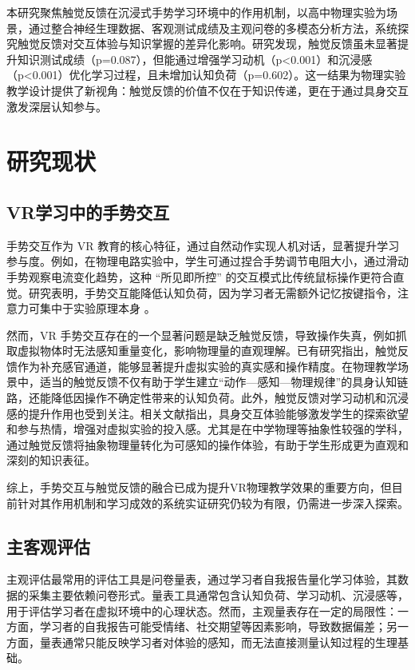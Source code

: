 \documentclass[runningheads]{llncs}
\begin{document}
本研究聚焦触觉反馈在沉浸式手势学习环境中的作用机制，以高中物理实验为场景，通过整合神经生理数据、客观测试成绩及主观问卷的多模态分析方法，系统探究触觉反馈对交互体验与知识掌握的差异化影响。研究发现，触觉反馈虽未显著提升知识测试成绩（p=0.087），但能通过增强学习动机（p<0.001）和沉浸感（p<0.001）优化学习过程，且未增加认知负荷（p=0.602）。这一结果为物理实验教学设计提供了新视角：触觉反馈的价值不仅在于知识传递，更在于通过具身交互激发深层认知参与。


\section{研究现状}
\subsection{VR学习中的手势交互} 

手势交互作为 VR 教育的核心特征，通过自然动作实现人机对话，显著提升学习参与度\cite{johnson2017embodied}。例如，在物理电路实验中，学生可通过捏合手势调节电阻大小，通过滑动手势观察电流变化趋势，这种 “所见即所控” 的交互模式比传统鼠标操作更符合直觉\cite{philippe2020multimodal}。研究表明，手势交互能降低认知负荷，因为学习者无需额外记忆按键指令，注意力可集中于实验原理本身 \cite {hostetter2023comparing}。

然而，VR 手势交互存在的一个显著问题是缺乏触觉反馈，导致操作失真，例如抓取虚拟物体时无法感知重量变化，影响物理量的直观理解\cite{park2025ultraboard}。已有研究指出，触觉反馈作为补充感官通道，能够显著提升虚拟实验的真实感和操作精度。在物理教学场景中，适当的触觉反馈不仅有助于学生建立“动作—感知—物理规律”的具身认知链路，还能降低因操作不确定性带来的认知负荷\cite{zhai2021study}。此外，触觉反馈对学习动机和沉浸感的提升作用也受到关注。相关文献指出，具身交互体验能够激发学生的探索欲望和参与热情，增强对虚拟实验的投入感\cite{kontra2015physical,lindgren2016enhancing}。尤其是在中学物理等抽象性较强的学科，通过触觉反馈将抽象物理量转化为可感知的操作体验，有助于学生形成更为直观和深刻的知识表征\cite{han2011incorporating}。

综上，手势交互与触觉反馈的融合已成为提升VR物理教学效果的重要方向，但目前针对其作用机制和学习成效的系统实证研究仍较为有限，仍需进一步深入探索。

\subsection{主客观评估}
主观评估最常用的评估工具是问卷量表，通过学习者自我报告量化学习体验，其数据的采集主要依赖问卷形式。量表工具通常包含认知负荷\cite{sweller1988cognitive}、学习动机\cite{keller1987development}、沉浸感\cite{sherman2003understanding}等，用于评估学习者在虚拟环境中的心理状态。然而，主观量表存在一定的局限性：一方面，学习者的自我报告可能受情绪、社交期望等因素影响，导致数据偏差；另一方面，量表通常只能反映学习者对体验的感知，而无法直接测量认知过程的生理基础\cite{solano2024interoceptive}。
\end{document}
